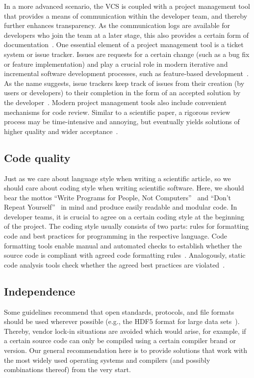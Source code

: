 \documentclass[@CLASSOPTIONS@]{tumarticle}
\begin{document}
In a more advanced scenario, the VCS is coupled with a project management
tool that provides a means of communication within the developer team, and
thereby further enhances transparency. As the communication logs are
available for developers who join the team at a later stage, this also
provides a certain form of documentation~\cite{bangerth2013}. One essential
element of a project management tool is a ticket system or issue tracker.
Issues are requests for a certain change (such as a bug fix or feature
implementation) and play a crucial role in modern iterative and incremental
software development processes, such as feature-based
development~\cite{highsmith2010}. As the name suggests, issue trackers keep
track of issues from their creation (by users or developers) to their
completion in the form of an accepted solution by the
developer~\cite{schlauch2018dlrguide}. Modern project management tools also
include convenient mechanisms for code review. Similar to a scientific paper,
a rigorous review process may be time-intensive and annoying, but eventually
yields solutions of higher quality and wider acceptance~\cite{wilson2014}.

\subsection{Code quality}

Just as we care about language style when writing a scientific article, so
we should care about coding style when writing scientific software. Here,
we should bear the mottos
``Write Programs for People, Not Computers''~\cite{wilson2014} and
``Don't Repeat Yourself''~\cite{hunt1999pragmatic, wilson2014} in mind and
produce easily readable and modular code. In developer teams, it is crucial
to agree on a certain coding style at the beginning of the project. The
coding style usually consists of two parts: rules for formatting code and
best practices for programming in the respective language. Code formatting
tools enable manual and automated checks to establish whether the source code
is compliant with agreed code formatting rules~\cite{netherlands-guide2019}.
Analogously, static code analysis tools check whether the agreed best
practices are violated~\cite{schlauch2018dlrguide}.

\subsection{Independence}
\label{sec:independence}

Some guidelines recommend that open standards, protocols, and file formats
should be used wherever possible (e.g., the HDF5 format for large data
sets~\cite{netherlands-guide2019}). Thereby, vendor lock-in situations are
avoided which would arise, for example, if a certain source code can only be
compiled using a certain compiler brand or version. Our general
recommendation here is to provide solutions that work with the most widely
used operating systems and compilers (and possibly combinations thereof)
from the very start.
\end{document}
